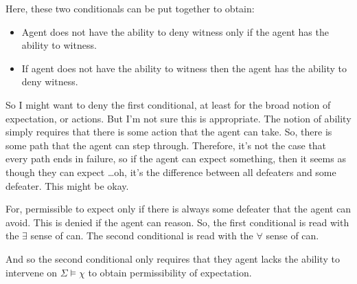 \documentclass[10pt]{article}
\begin{document}
Here, these two conditionals can be put together to obtain:
\begin{itemize}
\item Agent does not have the ability to deny witness only if the agent has the ability to witness.
\item If agent does not have the ability to witness then the agent has the ability to deny witness.
\end{itemize}

So I might want to deny the first conditional, at least for the broad notion of expectation, or actions.
But I'm not sure this is appropriate.
The notion of ability simply requires that there is some action that the agent can take.
So, there is some path that the agent can step through.
Therefore, it's not the case that every path ends in failure, so if the agent can expect something, then it seems as though they can expect \dots oh, it's the difference between all defeaters and some defeater.
This might be okay.

For, permissible to expect only if there is always some defeater that the agent can avoid.
This is denied if the agent can reason.
So, the first conditional is read with the \(\exists\) sense of can.
The second conditional is read with the \(\forall\) sense of can.

And so the second conditional only requires that they agent lacks the ability to intervene on \(\Sigma \vDash \chi\) to obtain permissibility of expectation.


\newpage

\printbibliography
\end{document}
